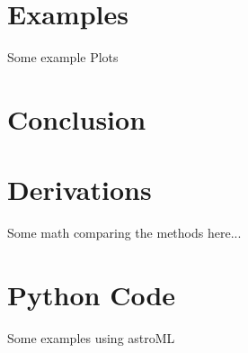 \documentclass[12pt]{article}
\begin{document}
\section{Examples}
Some example Plots

\section{Conclusion}


\begin{appendix}
\section{Derivations}

Some math comparing the methods here...


\section{Python Code}
Some examples using astroML


\end{appendix}
\end{document}
